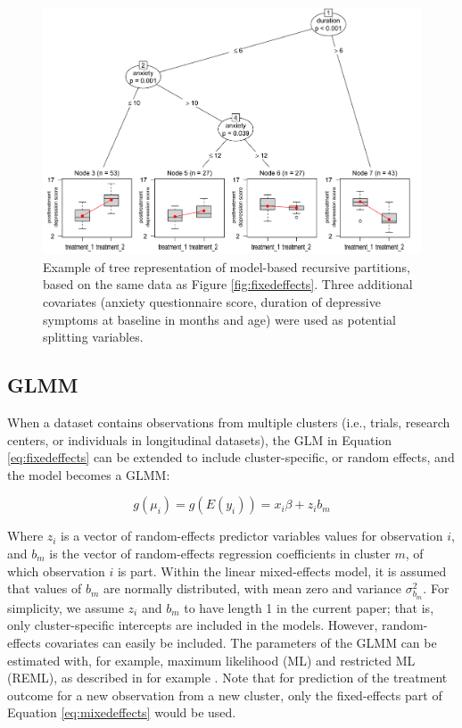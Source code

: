 \documentclass[nobf,doc]{apa}
\begin{document}
\begin{figure}[!h]
    \includegraphics[width=15cm]{Interaction_ex;treedepth3.pdf}
    \caption{Example of tree representation of model-based recursive partitions, based on the same data as Figure \ref{fig:fixedeffects}. Three additional covariates (anxiety questionnaire score, duration of depressive symptoms at baseline in months and age) were used as potential splitting variables.}
    \label{fig:example_mobtree}
\end{figure}



\subsection{GLMM}
When a dataset contains observations from multiple clusters (i.e., trials, research centers, or individuals in longitudinal datasets), the GLM in Equation \ref{eq:fixedeffects} can be extended to include cluster-specific, or random effects, and the model becomes a GLMM:

\begin{equation}
\label{eq:mixedeffects}
	g(\mu_{i}) = g(E(y_{i})) = x_{i}\beta + z_{i}b_{m}
\end{equation}

Where $z_{i}$ is a vector of random-effects predictor variables values for observation $i$, and $b_{m}$ is the vector of random-effects regression coefficients in cluster $m$, of which observation $i$ is part. Within the linear mixed-effects model, it is assumed that values of $b_{m}$ are normally distributed, with mean zero and variance $\sigma^{2}_{b_m}$. For simplicity, we assume $z_{i}$ and $b_{m}$ to have length 1 in the current paper; that is, only cluster-specific intercepts are included in the models. However, random-effects covariates can easily be included. The parameters of the GLMM can be estimated with, for example, maximum likelihood (ML) and restricted ML (REML), as described in for example \cite{BrykyRaud92}. Note that for prediction of the treatment outcome for a new observation from a new cluster, only the fixed-effects part of Equation \ref{eq:mixedeffects} would be used. 
 
\end{document}

